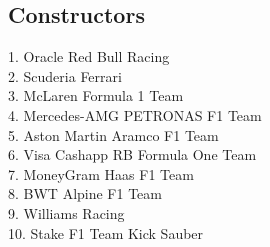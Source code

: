 \documentclass[12pt]{article}
\begin{document}
\subsection{Constructors}
1. Oracle Red Bull Racing\\
2. Scuderia Ferrari\\
3. McLaren Formula 1 Team\\
4. Mercedes-AMG PETRONAS F1 Team\\
5. Aston Martin Aramco F1 Team\\
6. Visa Cashapp RB Formula One Team\\
7. MoneyGram Haas F1 Team\\
8. BWT Alpine F1 Team\\
9. Williams Racing\\
10. Stake F1 Team Kick Sauber
\end{document}
